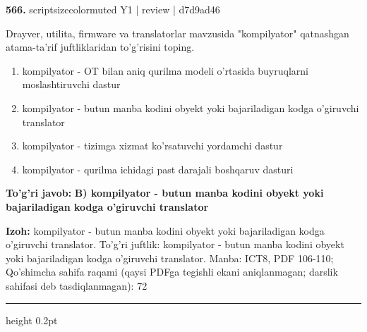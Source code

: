 \documentclass[10pt,a4paper]{article}
\begin{document}
{\bfseries\sffamily\color{ink} 566.} {scriptsizecolor{muted} Y1 | review | d7d9ad46}
\par
Drayver, utilita, firmware va translatorlar mavzusida "kompilyator" qatnashgan atama-ta'rif juftliklaridan to'g'risini toping.
\begin{enumerate}[label=\Alph*),leftmargin=9mm]
\item kompilyator - OT bilan aniq qurilma modeli o'rtasida buyruqlarni moslashtiruvchi dastur
\item kompilyator - butun manba kodini obyekt yoki bajariladigan kodga o'giruvchi translator
\item kompilyator - tizimga xizmat ko'rsatuvchi yordamchi dastur
\item kompilyator - qurilma ichidagi past darajali boshqaruv dasturi
\end{enumerate}
\begin{tcolorbox}[enhanced,breakable,colback=teal!4,colframe=teal!60!black,boxrule=0.45pt,arc=1.2mm,left=2.7mm,right=2.7mm,top=1.8mm,bottom=1.8mm,before skip=2mm,after skip=2mm]
{\bfseries\sffamily\color{teal}To'g'ri javob:} \textbf{B) kompilyator - butun manba kodini obyekt yoki bajariladigan kodga o'giruvchi translator}
\par\smallskip
{\bfseries Izoh:} kompilyator - butun manba kodini obyekt yoki bajariladigan kodga o'giruvchi translator. To'g'ri juftlik: kompilyator - butun manba kodini obyekt yoki bajariladigan kodga o'giruvchi translator. Manba: ICT8, PDF 106-110; Qo'shimcha sahifa raqami (qaysi PDFga tegishli ekani aniqlanmagan; darslik sahifasi deb tasdiqlanmagan): 72
\end{tcolorbox}
\vspace{2mm}\hrule height 0.2pt\vspace{3mm}
\end{document}
